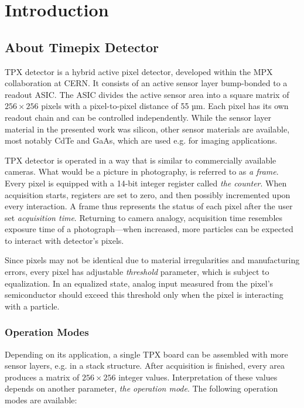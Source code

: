 \chapter{Introduction}

\section{About Timepix Detector}
TPX detector \cite{Timepix} is a hybrid active pixel detector, developed within the MPX collaboration at CERN. It consists of an active sensor layer bump-bonded to a readout ASIC. The ASIC divides the active sensor area into a square matrix of $256 \times 256$ pixels with a pixel-to-pixel distance of 55 µm. Each pixel has its own readout chain and can be controlled independently. While the sensor layer material in the presented work was silicon, other sensor materials are available, most notably CdTe and GaAs, which are used e.g. for imaging applications.

TPX detector is operated in a way that is similar to commercially available cameras. What would be a picture in photography, is referred to as \textit{a frame}. Every pixel is equipped with a 14-bit integer register called \textit{the counter}. When acquisition starts, registers are set to zero, and then possibly incremented upon every interaction. A frame thus represents the status of each pixel after the user set \textit{acquisition time}. Returning to camera analogy, acquisition time resembles exposure time of a photograph---when increased, more particles can be expected to interact with detector's pixels.

Since pixels may not be identical due to material irregularities and manufacturing errors, every pixel has adjustable \textit{threshold} parameter, which is subject to equalization. In an equalized state, analog input measured from the pixel's semiconductor should exceed this threshold only when the pixel is interacting with a particle.

\subsection{Operation Modes}\label{section:operation-modes}
Depending on its application, a single TPX board can be assembled with more sensor layers, e.g. in a stack structure. After acquisition is finished, every area produces a matrix of $256\times 256$ integer values. Interpretation of these values depends on another parameter, \textit{the operation mode}. The following operation modes are available:


